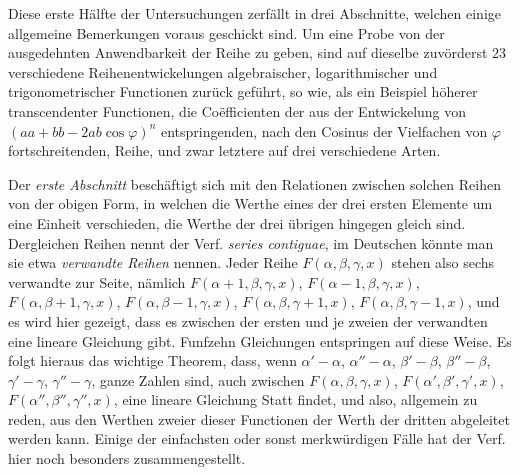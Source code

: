 Diese erste Hälfte der Untersuchungen zerfällt in drei Abschnitte, welchen einige allgemeine Bemerkungen voraus geschickt sind. Um eine Probe von der ausgedehnten Anwendbarkeit der Reihe zu geben, sind auf dieselbe zuvörderst $23$ verschiedene Reihenentwickelungen algebraischer, logarithmischer und trigonometrischer Functionen zurück geführt, so wie, als ein Beispiel höherer transcendenter Functionen, die Coëfficienten der aus der Entwickelung von $(aa+bb-2ab\cos\varphi)^n$ entspringenden, nach den Cosinus der Vielfachen von $\varphi$ fortschreitenden, Reihe, und zwar letztere auf drei verschiedene Arten.

Der \textit{erste Abschnitt} beschäftigt sich mit den Relationen zwischen solchen Reihen von der obigen Form, in welchen die Werthe eines der drei ersten Elemente um eine Einheit verschieden, die Werthe der drei übrigen hingegen gleich sind. Dergleichen Reihen nennt der Verf. \textit{series contiguae}, im Deutschen könnte man sie etwa \textit{verwandte Reihen} nennen. Jeder Reihe $F(\alpha,\beta,\gamma,x)$ stehen also sechs verwandte zur Seite, nämlich $F(\alpha+1,\beta,\gamma,x)$, $F(\alpha-1,\beta,\gamma,x)$, $F(\alpha,\beta+1,\gamma,x)$, $F(\alpha,\beta-1,\gamma,x)$, $F(\alpha,\beta,\gamma+1,x)$, $F(\alpha,\beta,\gamma-1,x)$, und es wird hier gezeigt, dass es zwischen der ersten und je zweien der verwandten eine lineare Gleichung gibt. Funfzehn Gleichungen entspringen auf diese Weise. Es folgt hieraus das wichtige Theorem, dass, wenn $\alpha'-\alpha$, $\alpha''-\alpha$, $\beta'-\beta$, $\beta''-\beta$, $\gamma'-\gamma$, $\gamma''-\gamma$, ganze Zahlen sind, auch zwischen $F(\alpha,\beta,\gamma,x)$, $F(\alpha',\beta',\gamma',x)$, $F(\alpha'',\beta'',\gamma'',x)$, eine lineare Gleichung Statt findet, und also, allgemein zu reden, aus den Werthen zweier dieser Functionen der Werth der dritten abgeleitet werden kann. Einige der einfachsten oder sonst merkwürdigen Fälle hat der Verf. hier noch besonders zusammengestellt.

